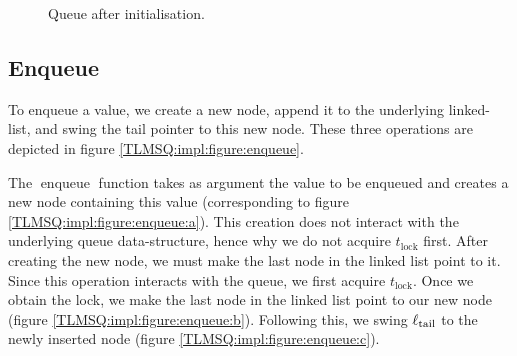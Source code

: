 \documentclass[a4paper, 10pt]{report}
\theoremstyle{definition}
\newcommand{\enqueue}{\operatorname{enqueue}}
\newcommand{\locinM}[1]{\loc_{#1\_\mathrm{in}}}
\newcommand{\locoutM}[1]{\loc_{#1\_\mathrm{out}}}
\newcommand{\locN}[1]{\loc_{\mathrm{#1}}}
\newcommand{\lochead}{\locN{head}}
\newcommand{\loctail}{\locN{tail}}
\newcommand{\node}{x}
\newcommand{\Tlock}{t_{\mathrm{lock}}}
\begin{document}
\begin{figure}
  \centering
  \begin{adjustbox}{center}
  \end{adjustbox}
  \caption{Queue after initialisation.}
  \label{TLMSQ:impl:figure:init}
\end{figure}

\subsection{Enqueue}
\label{TLMSQ:implementation:sub:enqueue}

To enqueue a value, we create a new node, append it to the underlying linked-list, and swing the tail pointer to this new node. These three operations are depicted in figure \ref{TLMSQ:impl:figure:enqueue}.

The $\enqueue$ function takes as argument the value to be enqueued and creates a new node containing this value (corresponding to figure \ref{TLMSQ:impl:figure:enqueue:a}). This creation does not interact with the underlying queue data-structure, hence why we do not acquire $\Tlock$ first. After creating the new node, we must make the last node in the linked list point to it. Since this operation interacts with the queue, we first acquire $\Tlock$. Once we obtain the lock, we make the last node in the linked list point to our new node (figure \ref{TLMSQ:impl:figure:enqueue:b}). Following this, we swing $\loctail$ to the newly inserted node (figure \ref{TLMSQ:impl:figure:enqueue:c}).
\end{document}
